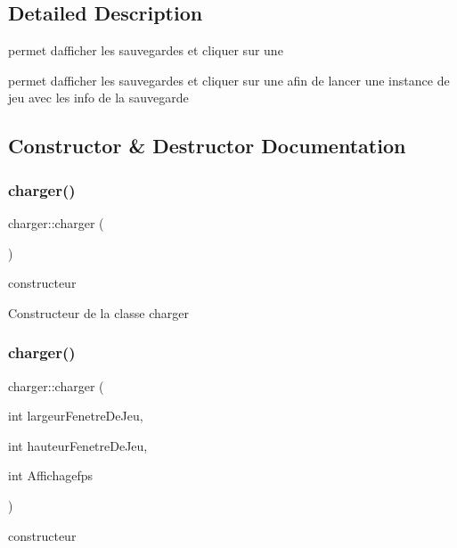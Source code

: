 \subsection{Detailed Description}
permet d\textquotesingle{}afficher les sauvegardes et cliquer sur une 

permet d\textquotesingle{}afficher les sauvegardes et cliquer sur une afin de lancer une instance de jeu avec les info de la sauvegarde 

\subsection{Constructor \& Destructor Documentation}
\mbox{\label{classcharger_ad1fa3b994691eedb2c210570f5ccd5f3}} 
\subsubsection{\texorpdfstring{charger()}{charger()}\hspace{0.1cm}{\footnotesize\ttfamily [1/2]}}
{\footnotesize\ttfamily charger\+::charger (\begin{DoxyParamCaption}{ }\end{DoxyParamCaption})}



constructeur 

Constructeur de la classe charger \mbox{\label{classcharger_a2776f26278d60aef70fffee5b76faabf}} 
\subsubsection{\texorpdfstring{charger()}{charger()}\hspace{0.1cm}{\footnotesize\ttfamily [2/2]}}
{\footnotesize\ttfamily charger\+::charger (\begin{DoxyParamCaption}\item[{int}]{largeur\+Fenetre\+De\+Jeu,  }\item[{int}]{hauteur\+Fenetre\+De\+Jeu,  }\item[{int}]{Affichagefps }\end{DoxyParamCaption})}



constructeur 

